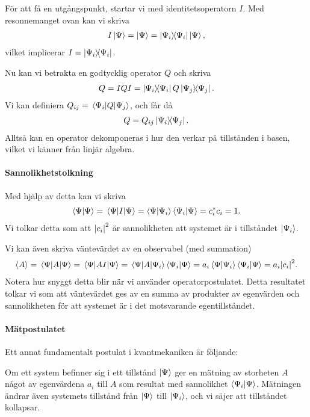 För att få en utgångspunkt, startar vi med identitetsoperatorn $I$. Med resonnemanget ovan kan vi skriva
\begin{align*}
	I\ket{\Psi} = \ket{\Psi} = \op{\Psi_{i}}{\Psi_{i}}\ket{\Psi},
\end{align*}
vilket implicerar $I = \op{\Psi_{i}}{\Psi_{i}}$.

Nu kan vi betrakta en godtycklig operator $Q$ och skriva
\begin{align*}
	Q = IQI = \op{\Psi_{i}}{\Psi_{i}}Q\op{\Psi_{j}}{\Psi_{j}}.
\end{align*}
Vi kan definiera $Q_{ij} = \mel{\Psi_{i}}{Q}{\Psi_{j}}$, och får då
\begin{align*}
	Q = Q_{ij}\op{\Psi_{i}}{\Psi_{j}}.
\end{align*}
Alltså kan en operator dekomponeras i hur den verkar på tillstånden i basen, vilket vi känner från linjär algebra.

\paragraph{Sannolikhetstolkning}
Med hjälp av detta kan vi skriva
\begin{align*}
	\braket{\Psi} = \ev{I}{\Psi} = \braket{\Psi}{\Psi_{i}}\braket{\Psi_{i}}{\Psi} = \cc{c_{i}}c_{i} = 1.
\end{align*}
Vi tolkar detta som att $\abs{c_{i}}^{2}$ är sannolikheten att systemet är i tillståndet $\ket{\Psi_{i}}$.

Vi kan även skriva väntevärdet av en observabel (med summation)
\begin{align*}
	\expval{A} = \ev{A}{\Psi} = \ev{AI}{\Psi} = \mel{\Psi}{A}{\Psi_{i}}\braket{\Psi_{i}}{\Psi} = a_{i}\braket{\Psi}{\Psi_{i}}\braket{\Psi_{i}}{\Psi} = a_{i}\abs{c_{i}}^{2}.
\end{align*}
Notera hur snyggt detta blir när vi använder operatorpostulatet. Detta resultatet tolkar vi som att väntevärdet ges av en summa av produkter av egenvärden och sannolikheten för att systemet är i det motsvarande egentillståndet.

\paragraph{Mätpostulatet}
Ett annat fundamentalt postulat i kvantmekaniken är följande:

Om ett system befinner sig i ett tillstånd $\ket{\Psi}$ ger en mätning av storheten $A$ något av egenvärdena $a_{i}$ till $A$ som resultat med sannolikhet $\braket{\Psi_{i}}{\Psi}$. Mätningen ändrar även systemets tillstånd från $\ket{\Psi}$ till $\ket{\Psi_{i}}$, och vi säjer att tillståndet kollapsar.

